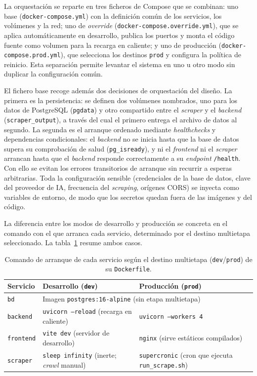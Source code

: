 La orquestación se reparte en tres ficheros de Compose que se combinan: uno base
(\texttt{docker-compose.yml}) con la definición común de los servicios, los
volúmenes y la red; uno de \emph{override} (\texttt{docker-compose.override.yml}),
que se aplica automáticamente en desarrollo, publica los puertos y monta el código
fuente como volumen para la recarga en caliente; y uno de producción
(\texttt{docker-compose.prod.yml}), que selecciona los destinos \texttt{prod} y
configura la política de reinicio. Esta separación permite levantar el sistema en
uno u otro modo sin duplicar la configuración común.

El fichero base recoge además dos decisiones de orquestación del diseño. La primera
es la persistencia: se definen dos volúmenes nombrados, uno para los datos de
PostgreSQL (\texttt{pgdata}) y otro compartido entre el \emph{scraper} y el
\emph{backend} (\texttt{scraper\_output}), a través del cual el primero entrega el
archivo de datos al segundo. La segunda es el arranque ordenado mediante
\emph{healthchecks} y dependencias condicionales: el \emph{backend} no se inicia
hasta que la base de datos supera su comprobación de salud (\texttt{pg\_isready}), y
ni el \emph{frontend} ni el \emph{scraper} arrancan hasta que el \emph{backend}
responde correctamente a su \emph{endpoint} \texttt{/health}. Con ello se evitan los
errores transitorios de arranque sin recurrir a esperas arbitrarias. Toda la
configuración sensible (credenciales de la base de datos, clave del proveedor de IA,
frecuencia del \emph{scraping}, orígenes CORS) se inyecta como variables de entorno,
de modo que los secretos quedan fuera de las imágenes y del código.

La diferencia entre los modos de desarrollo y producción se concreta en el
comando con el que arranca cada servicio, determinado por el destino multietapa
seleccionado. La tabla~\ref{tab:targets-docker} resume ambos casos.

\begin{table}[H]
\centering
\begin{tabular}{p{2.4cm}p{5.2cm}p{4.4cm}}
\hline
\textbf{Servicio} & \textbf{Desarrollo (\texttt{dev})} & \textbf{Producción (\texttt{prod})} \\
\hline
\texttt{bd} & \multicolumn{2}{p{9.6cm}}{Imagen \texttt{postgres:16-alpine} (sin etapa multietapa)} \\
\hline
\texttt{backend} & \texttt{uvicorn --reload} (recarga en caliente) & \texttt{uvicorn --workers 4} \\
\hline
\texttt{frontend} & \texttt{vite dev} (servidor de desarrollo) & \texttt{nginx} (sirve estáticos compilados) \\
\hline
\texttt{scraper} & \texttt{sleep infinity} (inerte; \emph{crawl} manual) & \texttt{supercronic} (cron que ejecuta \texttt{run\_scrape.sh}) \\
\hline
\end{tabular}
\caption{Comando de arranque de cada servicio según el destino multietapa
(\texttt{dev}/\texttt{prod}) de su \texttt{Dockerfile}.}
\label{tab:targets-docker}
\end{table}


